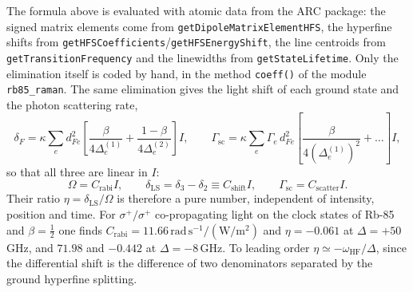 The formula above is evaluated with atomic data from the ARC package: the
signed matrix elements come from \texttt{getDipoleMatrixElementHFS}, the
hyperfine shifts from \texttt{getHFSCoefficients}/\texttt{getHFSEnergyShift},
the line centroids from \texttt{getTransitionFrequency} and the linewidths from
\texttt{getStateLifetime}. Only the elimination itself is coded by hand, in the method \texttt{coeff()}
of the module \texttt{rb85\_raman}. The same elimination gives the light shift of
each ground state and the photon scattering rate,
\begin{equation}
\delta_F=\kappa\sum_e d_{Fe}^2
\left[\frac{\beta}{4\Delta_e^{(1)}}+\frac{1-\beta}{4\Delta_e^{(2)}}\right]I,
\qquad
\Gamma_\mathrm{sc}=\kappa\sum_e\Gamma_e\,d_{Fe}^2
\left[\frac{\beta}{4(\Delta_e^{(1)})^2}+\dots\right]I ,
\end{equation}
so that all three are linear in $I$:
\begin{equation}
\Omega=C_\mathrm{rabi}I,\qquad
\delta_\mathrm{LS}=\delta_3-\delta_2\equiv C_\mathrm{shift}I,\qquad
\Gamma_\mathrm{sc}=C_\mathrm{scatter}I .
\end{equation}
Their ratio $\eta=\delta_\mathrm{LS}/\Omega$ is therefore a pure number,
independent of intensity, position and time. For $\sigma^+/\sigma^+$
co-propagating light on the clock states of Rb-85 and $\beta=\tfrac12$ one finds
$C_\mathrm{rabi}=11.66\,\mathrm{rad\,s^{-1}}/(\mathrm{W/m^2})$ and
$\eta=-0.061$ at $\Delta=+50$\,GHz, and $71.98$ and $-0.442$ at
$\Delta=-8$\,GHz. To leading order
$\eta\simeq-\omega_\mathrm{HF}/\Delta$, since the differential shift is the
difference of two denominators separated by the ground hyperfine splitting.

